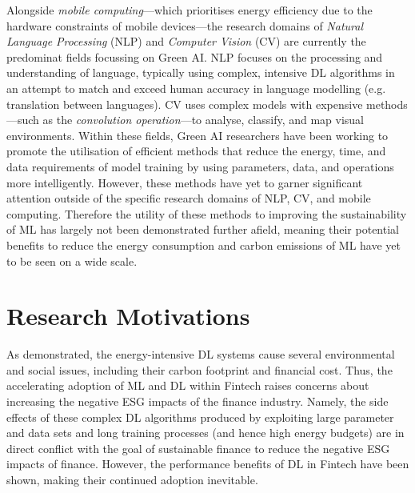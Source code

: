 \documentclass[a4paper, 11pt]{report}
\begin{document}
    Alongside \emph{mobile computing}---which prioritises energy efficiency due to the hardware constraints of mobile devices---the research domains of \emph{Natural Language Processing} (NLP) and \emph{Computer Vision} (CV) are currently the predominat fields focussing on Green AI. NLP focuses on the processing and understanding of language, typically using complex, intensive DL algorithms in an attempt to match and exceed human accuracy in language modelling (e.g. translation between languages). CV uses complex models with expensive methods---such as the \emph{convolution operation}---to analyse, classify, and map visual environments. Within these fields, Green AI researchers have been working to promote the utilisation of efficient methods that reduce the energy, time, and data requirements of model training by using parameters, data, and operations more intelligently. However, these methods have yet to garner significant attention outside of the specific research domains of NLP, CV, and mobile computing. Therefore the utility of these methods to improving the sustainability of ML has largely not been demonstrated further afield, meaning their potential benefits to reduce the energy consumption and carbon emissions of ML have yet to be seen on a wide scale.


    \section{Research Motivations}
    \label{section: motivations}

    As demonstrated, the energy-intensive DL systems cause several environmental and social issues, including their carbon footprint and financial cost. Thus, the accelerating adoption of ML and DL within Fintech raises concerns about increasing the negative ESG impacts of the finance industry. Namely, the side effects of these complex DL algorithms produced by exploiting large parameter and data sets and long training processes (and hence high energy budgets) are in direct conflict with the goal of sustainable finance to reduce the negative ESG impacts of finance. However, the performance benefits of DL in Fintech have been shown, making their continued adoption inevitable. 
\end{document}
